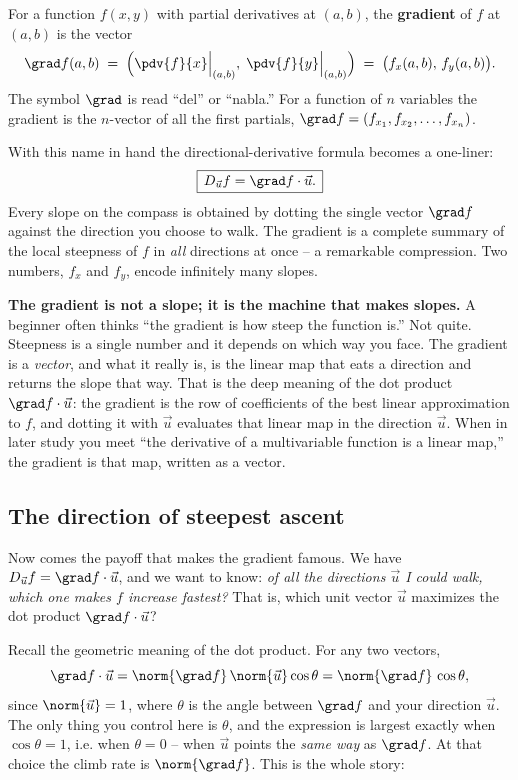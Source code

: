 \begin{definition}
\label{ch33:def-gradient}
For a function $f(x,y)$ with partial derivatives at $(a,b)$, the \textbf{gradient}
of $f$ at $(a,b)$ is the vector
\[
  \grad f(a,b) \;=\; \Big(\pdv{f}{x}\Big|_{(a,b)},\; \pdv{f}{y}\Big|_{(a,b)}\Big)
  \;=\; \big(f_x(a,b),\, f_y(a,b)\big).
\]
The symbol $\grad$ is read ``del'' or ``nabla.'' For a function of $n$ variables
the gradient is the $n$-vector of all the first partials,
$\grad f = (f_{x_1}, f_{x_2}, \dots, f_{x_n})$.
\end{definition}

With this name in hand the directional-derivative formula becomes a one-liner:
\[
  \boxed{\,D_{\vec u} f = \grad f \cdot \vec u.\,}
\]
Every slope on the compass is obtained by dotting the single vector $\grad f$
against the direction you choose to walk. The gradient is a complete summary of
the local steepness of $f$ in \emph{all} directions at once -- a remarkable
compression. Two numbers, $f_x$ and $f_y$, encode infinitely many slopes.

\begin{happeningbox}
\textbf{The gradient is not a slope; it is the machine that makes slopes.} A
beginner often thinks ``the gradient is how steep the function is.'' Not quite.
Steepness is a single number and it depends on which way you face. The gradient is
a \emph{vector}, and what it really is, is the linear map that eats a direction and
returns the slope that way. That is the deep meaning of the dot product
$\grad f\cdot \vec u$: the gradient is the row of coefficients of the best linear
approximation to $f$, and dotting it with $\vec u$ evaluates that linear map in the
direction $\vec u$. When in later study you meet ``the derivative of a
multivariable function is a linear map,'' the gradient is that map, written as a
vector.
\end{happeningbox}

\subsection{The direction of steepest ascent}

Now comes the payoff that makes the gradient famous. We have
$D_{\vec u} f = \grad f \cdot \vec u$, and we want to know: \emph{of all the
directions $\vec u$ I could walk, which one makes $f$ increase fastest?} That is,
which unit vector $\vec u$ maximizes the dot product $\grad f \cdot \vec u$?

Recall the geometric meaning of the dot product. For any two vectors,
\[
  \grad f \cdot \vec u = \norm{\grad f}\,\norm{\vec u}\cos\theta
  = \norm{\grad f}\,\cos\theta,
\]
since $\norm{\vec u}=1$, where $\theta$ is the angle between $\grad f$ and your
direction $\vec u$. The only thing you control here is $\theta$, and the
expression is largest exactly when $\cos\theta=1$, i.e. when $\theta=0$ -- when
$\vec u$ points the \emph{same way} as $\grad f$. At that choice the climb rate is
$\norm{\grad f}$. This is the whole story:

